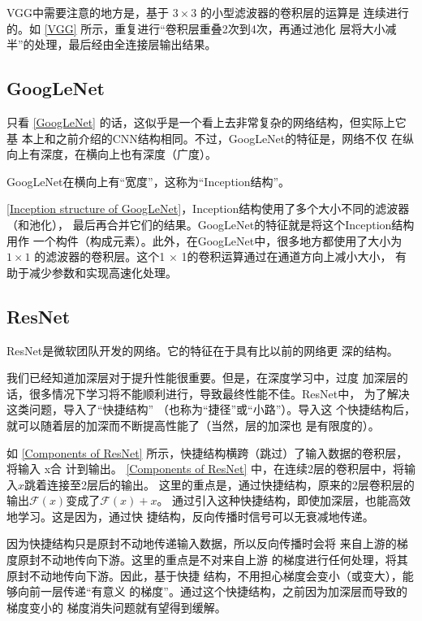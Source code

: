 VGG中需要注意的地方是，基于 $3\times 3$ 的小型滤波器的卷积层的运算是
连续进行的。如 \autoref{VGG} 所示，重复进行“卷积层重叠2次到4次，再通过池化
层将大小减半”的处理，最后经由全连接层输出结果。


\subsection{GoogLeNet}
只看 \autoref{GoogLeNet} 的话，这似乎是一个看上去非常复杂的网络结构，但实际上它基
本上和之前介绍的CNN结构相同。不过，GoogLeNet的特征是，网络不仅
在纵向上有深度，在横向上也有深度（广度）。

GoogLeNet在横向上有“宽度”，这称为“Inception结构”。


\autoref{Inception structure of GoogLeNet}，Inception结构使用了多个大小不同的滤波器（和池化），
最后再合并它们的结果。GoogLeNet的特征就是将这个Inception结构用作
一个构件（构成元素）。此外，在GoogLeNet中，很多地方都使用了大小为 $1 \times 1$ 的滤波器的卷积层。这个1 × 1的卷积运算通过在通道方向上减小大小，
有助于减少参数和实现高速化处理。


\subsection{ResNet}
ResNet是微软团队开发的网络。它的特征在于具有比以前的网络更
深的结构。

我们已经知道加深层对于提升性能很重要。但是，在深度学习中，过度
加深层的话，很多情况下学习将不能顺利进行，导致最终性能不佳。ResNet中，
为了解决这类问题，导入了“快捷结构”
（也称为“捷径”或“小路”）。导入这
个快捷结构后，就可以随着层的加深而不断提高性能了（当然，层的加深也
是有限度的）。

如 \autoref{Components of ResNet} 所示，快捷结构横跨（跳过）了输入数据的卷积层，将输入 x合
计到输出。
\autoref{Components of ResNet} 中，在连续2层的卷积层中，将输入$x$跳着连接至2层后的输出。
这里的重点是，通过快捷结构，原来的2层卷积层的输出$\mathcal{F}(x)$变成了$\mathcal{F}(x) + x$。
通过引入这种快捷结构，即使加深层，也能高效地学习。这是因为，通过快
捷结构，反向传播时信号可以无衰减地传递。


\begin{tcolorbox}
    因为快捷结构只是原封不动地传递输入数据，所以反向传播时会将
    来自上游的梯度原封不动地传向下游。这里的重点是不对来自上游
    的梯度进行任何处理，将其原封不动地传向下游。因此，基于快捷
    结构，不用担心梯度会变小（或变大），能够向前一层传递“有意义
    的梯度”。通过这个快捷结构，之前因为加深层而导致的梯度变小的
    梯度消失问题就有望得到缓解。
\end{tcolorbox}

